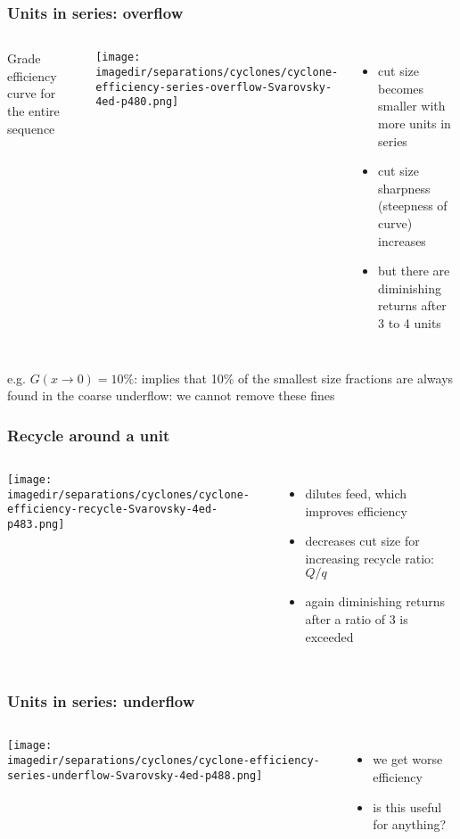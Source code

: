 \begin{frame}\frametitle{Units in series: overflow}
	\begin{columns}[t]
		Grade efficiency curve for the entire sequence
			\begin{center}
				\texttt{[image: \\imagedir/separations/cyclones/cyclone-efficiency-series-overflow-Svarovsky-4ed-p480.png]}
			\end{center}
		\begin{itemize}
			\item	cut size becomes smaller with more units in series
			\item	cut size sharpness (steepness of curve) increases
			\item	but there are diminishing returns after 3 to 4 units
		\end{itemize}
	\end{columns}
	\vspace{12pt}
	e.g. $G(x\rightarrow 0)=10\%$: implies that 10\% of the smallest size fractions are always found in the coarse underflow: we cannot remove these fines
\end{frame}

\begin{frame}\frametitle{Recycle around a unit}
	\begin{columns}[c]
			\begin{center}
				\texttt{[image: \\imagedir/separations/cyclones/cyclone-efficiency-recycle-Svarovsky-4ed-p483.png]}
			\end{center}
			\begin{itemize}
				\item	dilutes feed, which improves efficiency
				\item	decreases cut size for increasing recycle ratio: $Q/q$
				\item	again diminishing returns after a ratio of 3 is exceeded
			\end{itemize}
	\end{columns}
\end{frame}

\begin{frame}\frametitle{Units in series: underflow}
	\begin{columns}[t]
			\begin{center}
				\texttt{[image: \\imagedir/separations/cyclones/cyclone-efficiency-series-underflow-Svarovsky-4ed-p488.png]}
			\end{center}
		\begin{itemize}
			\item	we get worse efficiency
			\item	is this useful for anything?
		\end{itemize}
	\end{columns}
\end{frame}

